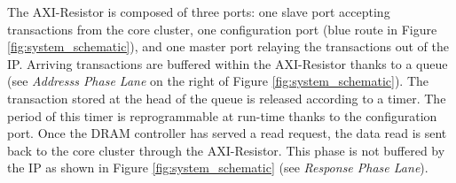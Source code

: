         The AXI-Resistor is composed of three ports: one slave port accepting transactions from the core cluster, one configuration port (blue route in Figure \ref{fig:system_schematic}), and one master port relaying the transactions out of the IP.
        Arriving transactions are buffered within the AXI-Resistor thanks to a queue (see \emph{Addresss Phase Lane} on the right of Figure \ref{fig:system_schematic}).
        The transaction stored at the head of the queue is released according to a timer.
        The period of this timer is reprogrammable at run-time thanks to the configuration port.
        Once the DRAM controller has served a read request, the data read is sent back to the core cluster through the AXI-Resistor.
        This phase is not buffered by the IP as shown in Figure \ref{fig:system_schematic} (see \emph{Response Phase Lane}).
